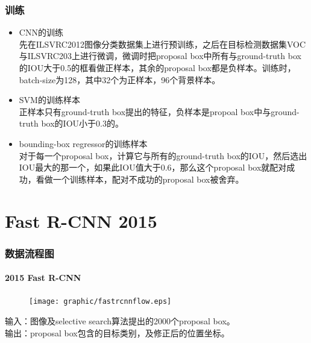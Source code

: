 \documentclass{beamer}
\begin{document}
\begin{frame}
    \frametitle{训练}
    \begin{itemize}
        \item CNN的训练 \\
        先在ILSVRC2012图像分类数据集上进行预训练，之后在目标检测数据集VOC与ILSVRC203上进行微调，微调时把proposal box中所有与ground-truth box的IOU大于0.5的框看做正样本，其余的proposal box都是负样本。训练时，batch-size为128，其中32个为正样本，96个背景样本。        
        \item SVM的训练样本 \\
        正样本只有ground-truth box提出的特征，负样本是propoal box中与ground-truth box的IOU小于0.3的。
        \item bounding-box regressor的训练样本   \\
        对于每一个proposal box，计算它与所有的ground-truth box的IOU，然后选出IOU最大的那一个，如果此IOU值大于$0.6$，那么这个proposal box就配对成功，看做一个训练样本，配对不成功的proposal box被舍弃。
    \end{itemize}
\end{frame}

\section{Fast R-CNN 2015}

\begin{frame}
    \frametitle{数据流程图}
    \framesubtitle{2015 Fast R-CNN}
    \begin{figure}
        \centering
        \texttt{[image: graphic/fastrcnnflow.eps]}
    \end{figure}
    输入：图像及selective search算法提出的2000个proposal box。  \\
    输出：proposal box包含的目标类别，及修正后的位置坐标。  \\
\end{frame}

\end{document}
